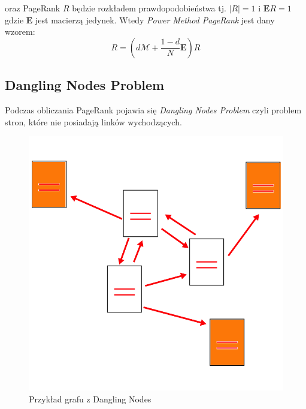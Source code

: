 \documentclass[licencjacka]{pracadypl}
\theoremstyle{definition}
\begin{document}
oraz PageRank $R$ będzie rozkładem prawdopodobieństwa tj. $\big|R\big| = 1$ i  $\mathbf{E}R = 1$ gdzie $\mathbf{E}$ jest macierzą jedynek.
Wtedy \textit{Power Method PageRank} jest dany wzorem: 
\[
	R = 
	\left( 
		d \mathcal{M} + 
		\frac{1 -d}{N} \mathbf{E}
	\right)
	R
\]

\subsection{Dangling Nodes Problem}

Podczas obliczania PageRank pojawia się \textit{Dangling Nodes Problem} czyli problem stron, które nie posiadają linków wychodzących. 

\begin{figure}[H]
	\centering
	\includegraphics[width=0.4\linewidth]{img/pagerank-dangling-node}
	\caption{Przykład grafu z Dangling Nodes}
\end{figure}
\end{document}
